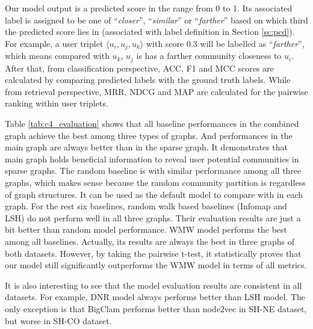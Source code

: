 Our model output is a predicted score in the range from 0 to 1. Its associated label is assigned to be one of ``\textit{closer}'', ``\textit{similar}'' or ``\textit{farther}'' based on which third the predicted score lies in (associated with label definition in Section \ref{sc:pcd}). For example, a user triplet $\langle u_i,u_j,u_k \rangle$ with score 0.3 will be labelled as ``\textit{farther}'', which means compared with $u_k$, $u_j$ is has a farther community closeness to $u_i$. After that, from classification perspective, ACC, F1 and MCC scores are calculated by comparing predicted labels with the ground truth labels. While from retrieval perspective, MRR, NDCG and MAP are calculated for the pairwise ranking within user triplets.

Table \ref{tab:c4_evaluation} shows that all baseline performances in the combined graph achieve the best among three types of graphs. And performances in the main graph are always better than in the sparse graph. It demonstrates that main graph holds beneficial information to reveal user potential communities in sparse graphs. The random baseline is with similar performance among all three graphs, which makes sense because the random community partition is regardless of graph structures. It can be used as the default model to compare with in each graph. For the rest six baselines, random walk based baselines (Infomap and LSH) do not perform well in all three graphs. Their evaluation results are just a bit better than random model performance. WMW model performs the best among all baselines. Actually, its results are always the best in three graphs of both datasets. However, by taking the pairwise t-test, it statistically proves that our model still significantly outperforms the WMW model in terms of all metrics.

It is also interesting to see that the model evaluation results are consistent in all datasets. For example, DNR model always performs better than LSH model. The only exception is that BigClam performs better than node2vec in SH-NE dataset, but worse in SH-CO dataset. 

